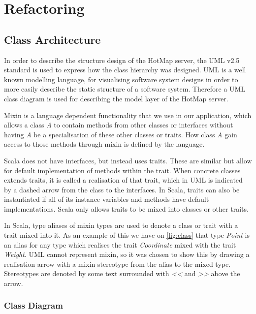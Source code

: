 \section{Refactoring} \label{sec:s4_refactoring}
\subsection{Class Architecture}
In order to describe the structure design of the HotMap server, the UML v2.5 standard is used to express how the class hierarchy was designed. UML is a well known modelling language, for visualising software system designs in order to more easily describe the static structure of a software system.
Therefore a UML class diagram is used for describing the model layer of the HotMap server.

Mixin is a language dependent functionality that we use in our application, which allows a class \emph{A} to contain methods from other classes or interfaces without having \emph{A} be a specialisation of these other classes or traits. How class \emph{A} gain access to those methods through mixin is defined by the language. 

Scala does not have interfaces, but instead uses traits. These are similar but allow for default implementation of methods within the trait. When concrete classes extends traits, it is called a realisation of that trait, which in UML is indicated by a dashed arrow from the class to the interfaces. In Scala, traits can also be instantiated if all of its instance variables and methods have default implementations. Scala only allows traits to be mixed into classes or other traits.

In Scala, type aliases of mixin types are used to denote a class or trait with a trait mixed into it. As an example of this we have on \cref{fig:class} that type \emph{Point} is an alias for any type which realises the trait \emph{Coordinate} mixed with the trait \emph{Weight}. UML cannot represent mixin, so it was chosen to show this by drawing a realisation arrow with a mixin stereotype from the alias to the mixed type. Stereotypes are denoted by some text surrounded with \emph{<<} and \emph{>>} above the arrow.

\subsubsection{Class Diagram}

